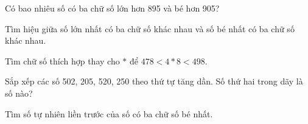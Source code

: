 \begin{ex} %
Có bao nhiêu số có ba chữ số lớn hơn 895 và bé hơn 905?
\end{ex}

\begin{ex} %
Tìm hiệu giữa số lớn nhất có ba chữ số khác nhau và số bé nhất có ba chữ số khác nhau.
\end{ex}

\begin{ex} %
Tìm chữ số thích hợp thay cho $*$ để $478 < 4*8 < 498$.
\end{ex}

\begin{ex} %
Sắp xếp các số 502, 205, 520, 250 theo thứ tự tăng dần. Số thứ hai trong dãy là số nào?
\end{ex}

\begin{ex} %
Tìm số tự nhiên liền trước của số có ba chữ số bé nhất.
\end{ex}

